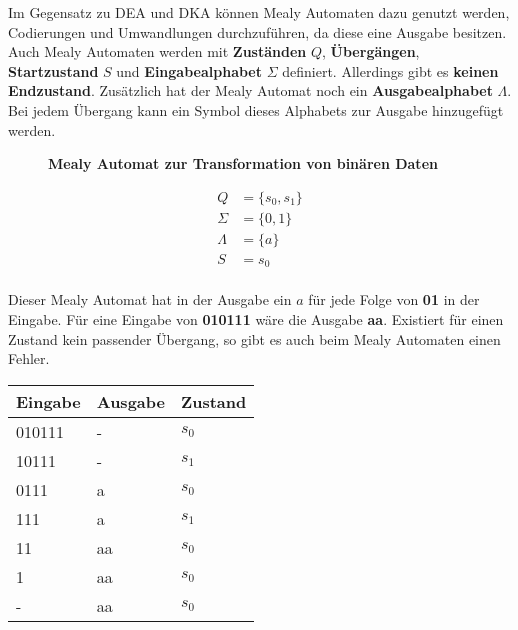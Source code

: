 Im Gegensatz zu DEA und DKA können Mealy Automaten dazu genutzt werden,
Codierungen und Umwandlungen durchzuführen, da diese eine Ausgabe besitzen.
Auch Mealy Automaten werden mit \textbf{Zuständen} $Q$, \textbf{Übergängen},
\textbf{Startzustand} $S$ und \textbf{Eingabealphabet} $\Sigma$
definiert. Allerdings gibt es \textbf{keinen Endzustand}.
Zusätzlich hat der Mealy Automat noch ein \textbf{Ausgabealphabet} $\Lambda$.
Bei jedem Übergang kann ein Symbol dieses Alphabets zur Ausgabe hinzugefügt werden.

\begin{figure}[h]
    \centering
    \caption*{\textbf{Mealy Automat zur Transformation von binären Daten}}
\end{figure}

\vspace*{-2cm}

\Large
\begin{align*}
    Q & = \{s_0, s_1\} \\
    \Sigma & = \{0, 1\} \\
    \Lambda & = \{a\} \\
    S & = s_0 \\
\end{align*}
\normalsize

Dieser Mealy Automat hat in der Ausgabe ein $a$ für jede Folge von \textbf{01} in
der Eingabe. Für eine Eingabe von \textbf{010111} wäre die Ausgabe \textbf{aa}.
Existiert für einen Zustand kein passender Übergang, so gibt es auch beim Mealy Automaten
einen Fehler.

\begin{table}[h]
    \begin{tabular}{|l|l|l|}
    \hline
    Eingabe & Ausgabe & Zustand \\ \hline
    010111 & - & $s_0$ \\ \hline
    10111 & - & $s_1$ \\ \hline
    0111 & a & $s_0$ \\ \hline
    111 & a & $s_1$ \\ \hline
    11 & aa & $s_0$ \\ \hline
    1 & aa & $s_0$ \\ \hline
    - & aa & $s_0$ \\ \hline
\end{tabular}
\end{table}